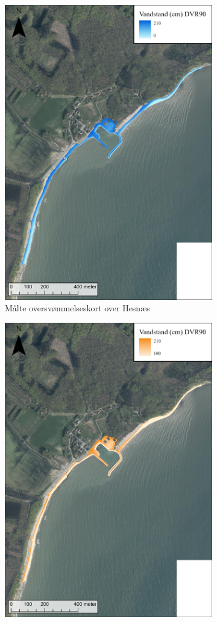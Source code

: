 \begin{figure}[H]
    \begin{subfigure}[t]{0.5\textwidth}
        \centering
        \includegraphics[width=0.8\linewidth]{images/Resultater/2023Malt/2023 resultat_hesnaes.jpg}
        \caption{Målte oversvømmelseskort over Hesnæs}
        \label{Subfig: Målt Hesnæs}
    \end{subfigure}
    \begin{subfigure}[t]{0.5\textwidth}
        \centering
        \includegraphics[width=0.8\linewidth]{images/Resultater/2023Model/2023 model_hesnaes.jpg}

\end{subfigure}
\end{figure}
